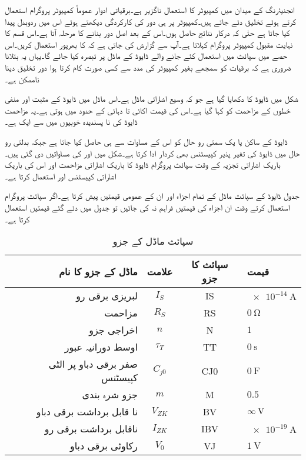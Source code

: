 انجنیئرنگ کے میدان میں کمپیوٹر کا استعمال ناگزیر ہے۔برقیاتی ادوار عموماً کمپیوٹر پروگرام استعمال کرتے ہوئے تخلیق دئے جاتے ہیں۔کمپیوٹر پر ہی دور کی کارکردگی دیکھتے ہوئے اس میں ردوبدل پیدا کیا جاتا ہے حتٰی کہ درکار نتائج حاصل ہوں۔اس کے بعد اصل دور بنانے کا مرحلہ آتا ہے۔اس قسم کا نہایت مقبول کمپیوٹر پروگرام   کہلاتا ہے۔آپ سے گزارش کی جاتی ہے کہ  کا بھرپور  استعمال کریں۔اس حصے میں سپائث میں استعمال کئے جانے والے ڈایوڈ کے ماڈل پر تبصرہ کیا جائے گا۔یہاں یہ بتلانا ضروری ہے کہ برقیات کو سمجھے بغیر کمپیوٹر کی مدد سے کسی صورت کام کرتا ہوا دور تخلیق دینا ناممکن ہے۔

شکل   میں ڈایوڈ کا  دکھایا گیا ہے جو کہ وسیع اشاراتی ماڈل ہے۔اس ماڈل میں ڈایوڈ کے مثبت اور منفی خطوں کے مزاحمت کو  کہا گیا ہے۔اس کی قیمت اکائی تا دہائی کے حدود میں ہوتی ہے۔یہ مزاحمت ڈایوڈ کی نا پسندیدہ خوبیوں میں سے ایک ہے۔

ڈایوڈ کے ساکن یا یک سمتی رو حال کو اس کے    مساوات سے ہی حاصل کیا جاتا ہے جبکہ بدلتی رو حال میں ڈایوڈ کی تغیر پذیر کپیسٹنس  بھی کردار ادا کرتا ہے۔شکل میں   اور  کی مساواتیں دی گئی ہیں۔باریک اشاراتی تجزیہ  کے وقت سپائث پروگرام ڈایوڈ کا باریک اشاراتی مزاحمت  اور اس کی باریک اشاراتی کپیسٹنس  اور  استعمال کرتا ہے۔

جدول   ڈایوڈ کے سپائث ماڈل کے تمام اجزاء اور ان کے عمومی قیمتیں پیش کرتا ہے۔اگر سپائث پروگرام استعمال کرتے وقت ان اجزاء کی قیمتیں فراہم نہ کی جائیں تو  جدول  میں دئے گئے قیمتیں استعمال کرتا ہے۔
\begin{table}
\caption{سپائث ماڈل کے جزو}
\label{جدول_سپائث_ماڈل_کے_جزو}
\centering
\begin{tabular}[htp]{r c c l}
\toprule
ماڈل کے جزو کا نام & علامت & سپائث کا جزو & قیمت \\
\midrule
لبریزی برقی رو   & $ I_S $    & IS & $\SI{e-14}{\ampere}$\\
مزاحمت & $R_S$  & RS & $\SI{0}{\ohm}$ \\
اخراجی جزو & $n$ & N & $1$ \\
اوسط دورانیہ عبور & $\tau_T$ & TT & $\SI{0}{\second}$\\
صفر برقی دباو پر الٹی کپیسٹنس & $C_{j0}$ & CJ0 & $\SI{0}{\farad}$\\
جزو شرہ بندی & $m$ & M & $0.5$\\
نا قابل برداشت برقی دباو &  $V_{ZK}$ & BV & $\infty \hspace{1mm} \si{\volt}$\\
ناقابل برداشت برقی رو & $I_{ZK}$ & IBV & $\SI{e-19}{\ampere}$\\
رکاوٹی برقی دباو & $V_0$ & VJ & $\SI{1}{\volt}$ \\
\bottomrule
\end{tabular}
\end{table}
%

